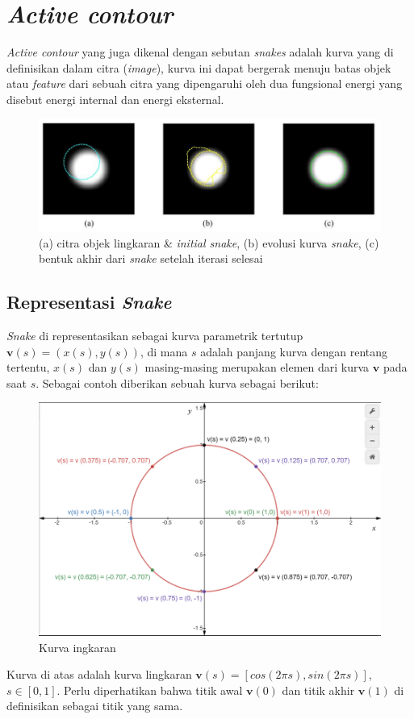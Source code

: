 \section{\emph{Active contour}}
\emph{Active contour} yang juga dikenal dengan sebutan \emph{snakes} adalah kurva yang di definisikan dalam citra (\emph{image}), kurva ini dapat bergerak menuju batas objek atau \emph{feature} dari sebuah citra yang dipengaruhi oleh dua fungsional energi yang disebut energi internal dan energi eksternal.
\begin{figure}[H]
	\centering
	\includegraphics[width=1\textwidth]{gambar/snake1}
	\caption{(a) citra objek lingkaran \& \emph{initial snake}, (b) evolusi kurva \emph{snake},
		(c) bentuk akhir dari \emph{snake} setelah iterasi selesai \citep{acton2007biomedical:19}}
	\label{Gambar:snake1}
\end{figure}

\subsection{Representasi \emph{Snake}}
\emph{Snake} di representasikan sebagai kurva parametrik tertutup $\textbf{v}(s) = (x(s), y(s))$, di mana $s$ adalah panjang kurva dengan rentang tertentu, $x(s)$ dan $y(s)$ masing-masing merupakan elemen dari kurva $\textbf{v}$ pada saat $s$. Sebagai contoh diberikan sebuah kurva sebagai berikut:
\begin{figure}[H]
	\centering
	\includegraphics[width=1\textwidth]{gambar/k_lingkaran}
	\caption{Kurva ingkaran}
	\label{Gambar:k_lingkaran}
\end{figure}
Kurva di atas adalah kurva lingkaran $\textbf{v}(s) = [cos (2 \pi s), sin (2 \pi s)]$, $s \in [0, 1]$. Perlu diperhatikan bahwa titik awal $\textbf{v}(0)$ dan titik akhir $\textbf{v}(1)$ di definisikan sebagai titik yang sama.

